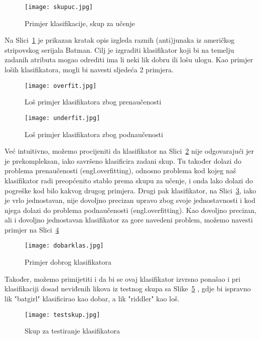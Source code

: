 \documentclass[times, utf8, zavrsni, numeric]{fer}
\begin{document}
\begin{figure}[H]
\centering
\texttt{[image: skupuc.jpg]}
\caption{Primjer klasifikacije, skup za učenje\cite{pic}}
\label{fig:skupuc}
\end{figure}

Na Slici~\ref{fig:skupuc} je prikazan kratak opis izgleda raznih (anti)junaka iz američkog stripovskog serijala Batman. Cilj je izgraditi klasifikator koji bi na temelju zadanih atributa mogao odrediti ima li neki lik dobru ili lošu ulogu. Kao primjer loših klasifikatora, mogli bi navesti sljedeća 2 primjera. 

\begin{figure}[H]
\centering
\texttt{[image: overfit.jpg]}
\caption{Loš primjer klasifikatora zbog prenaučenosti\cite{pic}}
\label{fig:overfit}
\end{figure}

\begin{figure}[H]
\centering
\texttt{[image: underfit.jpg]}
\caption{Loš primjer klasifikatora zbog podnaučenosti\cite{pic}}
\label{fig:underfit}
\end{figure}

Već intuitivno, možemo procijeniti da klasifikator na Slici~\ref{fig:overfit} nije odgovarajući jer je prekompleksan, iako savršeno klasificira zadani skup. Tu također dolazi do problema prenaučenosti (engl.overfitting), odnosno problema kod kojeg naš klasifikator radi preopćenito stablo prema skupu za učenje, i onda lako dolazi do pogreške kod bilo kakvog drugog primjera. Drugi pak klasifikator, na Slici~\ref{fig:underfit}, iako je vrlo jednostavan, nije dovoljno precizan upravo zbog svoje jednostavnosti i kod njega dolazi do problema podnaučenosti (engl.overfitting). Kao dovoljno precizan, ali i dovoljno jednostavan klasifikator za gore navedeni problem, možemo navesti primjer na Slici~\ref{fig:dobarklas}
\begin{figure}[H]
\centering
\texttt{[image: dobarklas.jpg]}
\caption{Primjer dobrog klasifikatora\cite{pic}}
\label{fig:dobarklas}
\end{figure}
Također, možemo primijetiti i da bi se ovaj klasifikator izvrsno ponašao i pri klasifikaciji dosad neviđenih likova iz testnog skupa sa Slike~\ref{fig:testskup} , gdje bi ispravno lik "batgirl" klasificirao kao dobar, a lik "riddler" kao loš.

\begin{figure}[H]
\centering
\texttt{[image: testskup.jpg]}
\caption{Skup za testiranje klasifikatora\cite{pic}}
\label{fig:testskup}
\end{figure}
\end{document}
